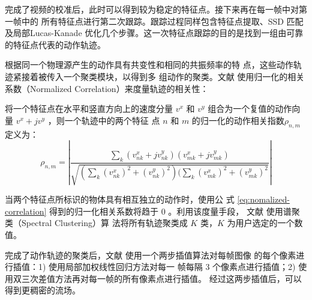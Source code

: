


完成了视频的校准后，此时可以得到较为稳定的特征点。接下来再在每一帧中对第一帧中的
所有特征点进行第二次跟踪。跟踪过程同样包含特征点提取、SSD 匹配及局部Lucas-Kanade
优化几个步骤。这一次特征点跟踪的目的是找到一组由可靠的特征点代表的动作轨迹。

根据同一个物理源产生的动作具有共变性和相同的共振频率的特
点，这些动作轨迹紧接着被传入一个聚类模块，以得到多
组动作的聚类。文献 \cite{liu2005motion} 使用归一化的相关系数（Normalized
Correlation）来度量轨迹的相关性：

\begin{definition}[归一化的动作相关系数]
将一个特征点在水平和竖直方向上的速度分量 $v^x$
和 $v^y$ 组合为一个复值的动作向量 $v^x + jv^y$ ，则一个轨迹中的两个特征
点 $n$ 和 $m$ 的归一化的动作相关指数$\rho_{n,m}$ 定义为：
\begin{equation}
  \label{eq:nomalized-correlation}
  \rho_{n,m}=\left|\frac{\sum_{k}(v_{nk}^{x}+jv_{nk}^{y})(v_{mk}^{x}+jv_{mk}^{y})}{\sqrt{(\sum_{k}(v_{nk}^x)^2+(v_{nk}^{y})^2)(\sum_{k}(v_{mk}^{x})^2+(v_{mk}^{y})^2}}\right|
\end{equation}
\end{definition}

当两个特征点所标识的物体具有相互独立的动作时，使用公
式 \ref{eq:nomalized-correlation} 得到的归一化相关系数将趋于 0 。利用该度量手段，
文献 \cite{liu2005motion} 使用谱聚类（Spectral Clustering）算
法将所有轨迹聚类成 $K$ 类，$K$ 为用户选定的一个数值。

完成了动作轨迹的聚类后，文献 \cite{liu2005motion} 使用一个两步插值算法对每帧图像
的每个像素进行插值：1) 使用局部加权线性回归方法对每一
帧每隔 3 个像素点进行插值；2) 使用双三次差值方法再对每一帧的所有像素点进行插值。
经过这两步插值后，可以得到更稠密的流场。

